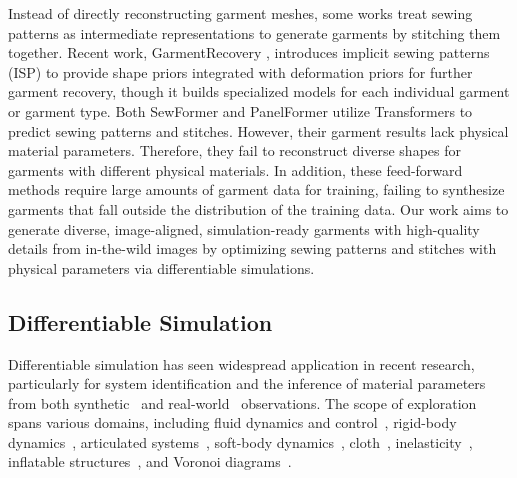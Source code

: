 Instead of directly reconstructing garment meshes, some works \cite{liu2023towards, he2024dresscode, korosteleva2023garmentcode} treat sewing patterns as intermediate representations to generate garments by stitching them together. Recent work, GarmentRecovery \cite{li2024garment}, introduces implicit sewing patterns (ISP) to provide shape priors integrated with deformation priors for further garment recovery, though it builds specialized models for each individual garment or garment type. Both SewFormer \cite{liu2023towards} and PanelFormer \cite{chen2024panelformer} utilize Transformers to predict sewing patterns and stitches. However, their garment results lack physical material parameters. Therefore, they fail to reconstruct diverse shapes for garments with different physical materials. In addition, these feed-forward methods require large amounts of garment data for training, failing to synthesize garments that fall outside the distribution of the training data. Our work aims to generate diverse, image-aligned, simulation-ready garments with high-quality details from in-the-wild images by optimizing sewing patterns and stitches with physical parameters via differentiable simulations.


\subsection{Differentiable Simulation}

Differentiable simulation has seen widespread application in recent research, particularly for system identification and the inference of material parameters from both synthetic~\cite{li2023pac, li2024neuralfluid} and real-world~\cite{huang2024differentiable, si2024difftactile} observations. The scope of exploration spans various domains, including fluid dynamics and control~\cite{mcnamara2004fluid, schenck2018spnets, li2023difffr, li2024neuralfluid}, rigid-body dynamics~\cite{freeman2021brax, strecke2021diffsdfsim, xu2023efficient}, articulated systems~\cite{geilinger2020add, qiao2021efficient, xu2021end}, soft-body dynamics~\cite{hahn2019real2sim, hu2019chainqueen, du2021diffpd, jatavallabhula2021gradsim, huang2024differentiable}, cloth~\cite{li2022diffcloth, stuyck2023diffxpbd, li2024diffavatar}, inelasticity~\cite{huang2021plasticinelab, li2023pac}, inflatable structures~\cite{panetta2021computational}, and Voronoi diagrams~\cite{numerow2024differentiable}.

